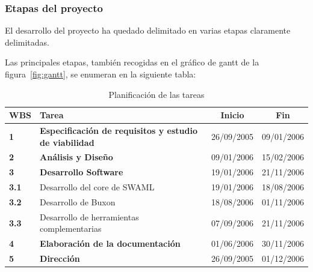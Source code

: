 \subsubsection{Etapas del proyecto}

El desarrollo del proyecto ha quedado delimitado en varias etapas claramente
delimitadas.

Las principales etapas, también recogidas en el gráfico de gantt de la 
figura~\ref{fig:gantt}, se enumeran en la siguiente tabla:


\begin{table}[H]
 \begin{center}
  \begin{tabular}{|l|l|c|c|}
	\hline
	\textbf{WBS} & \textbf{Tarea} & \textbf{Inicio} & \textbf{Fin} \\
	\hline
	\textbf{1}   & \textbf{Especificación de requisitos y estudio de viabilidad} & 26/09/2005 & 09/01/2006 \\
	\hline
	\textbf{2}   & \textbf{Análisis y Diseño} & 09/01/2006 & 15/02/2006 \\
	\hline
	\textbf{3}   & \textbf{Desarrollo Software} & 19/01/2006 & 21/11/2006 \\
	\textbf{3.1} & Desarrollo del core de SWAML & 19/01/2006 & 18/08/2006 \\	
	\textbf{3.2} & Desarrollo de Buxon & 18/08/2006 & 01/11/2006 \\
	\textbf{3.3} & Desarrollo de herramientas complementarias & 07/09/2006 & 21/11/2006 \\	
	\hline
	\textbf{4}   & \textbf{Elaboración de la documentación} & 01/06/2006 & 30/11/2006 \\	
	\hline
	\textbf{5}   & \textbf{Dirección} & 26/09/2005 & 01/12/2006 \\
	\hline
  \end{tabular}
  \caption{Planificación de las tareas}
 \end{center}
\end{table}

